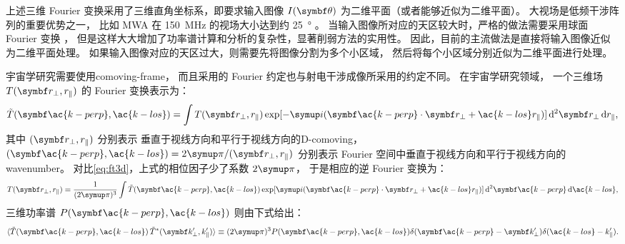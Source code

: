 上述三维 Fourier 变换采用了三维直角坐标系，即要求输入图像 $I(\B{\theta})$
为二维平面（或者能够近似为二维平面）。
大视场是低频干涉阵列的重要优势之一，
比如 MWA 在 \SI{150}{\MHz} 的视场大小达到约 \SI{25}{\degree} \cite{tingay2013}。
当输入图像所对应的天区较大时，严格的做法需要采用球面 Fourier 变换 \cite{liu2016sph}，
但是这样大大增加了功率谱计算和分析的复杂性，显著削弱方法的实用性。
因此，目前的主流做法是直接将输入图像近似为二维平面处理。
如果输入图像对应的天区过大，则需要先将图像分割为多个小区域，
然后将每个小区域分别近似为二维平面进行处理。

宇宙学研究需要使用\ac{comoving-frame}，
而且采用的 Fourier 约定也与射电干涉成像所采用的约定不同。
在宇宙学研究领域，
一个三维场 $T(\B{r}_{\perp}, r_{\parallel})$ 的 Fourier 变换表示为：
\begin{equation}
  \label{eq:ft3d-k}
  \tilde{T}(\B{\ac{k-perp}}, \ac{k-los}) =
    \int T(\B{r}_{\perp}, r_{\parallel})
    \exp[ -\Ci (\B{\ac{k-perp}} \cdot \B{r}_{\perp}
      + \ac{k-los} r_{\parallel}) ]
    \,\mathrm{d}^2\B{r}_{\perp} \,\D{r_{\parallel}} ,
\end{equation}
其中 $(\B{r}_{\perp}, r_{\parallel})$ 分别表示
垂直于视线方向和平行于视线方向的\acl{D-comoving}，
$(\B{\ac{k-perp}}, \ac{k-los}) = 2\Cpi / (\B{r}_{\perp}, r_{\parallel})$
分别表示 Fourier 空间中垂直于视线方向和平行于视线方向的\ac{wavenumber}。
对比\autoref{eq:ft3d}，上式的相位因子少了系数 $2\Cpi$，
于是相应的逆 Fourier 变换为：
\begin{equation}
  T(\B{r}_{\perp}, r_{\parallel}) =
    \frac{1}{(2\Cpi)^3} \int \tilde{T}(\B{\ac{k-perp}}, \ac{k-los})
    \exp[ \Ci (\B{\ac{k-perp}} \cdot \B{r}_{\perp}
      + \ac{k-los} r_{\parallel}) ]
    \,\mathrm{d}^2\B{\ac{k-perp}} \,\D{\ac{k-los}} ,
\end{equation}
三维功率谱 $P(\B{\ac{k-perp}}, \ac{k-los})$ 则由下式给出：
\begin{equation}
  \label{eq:ps3d-k}
  \langle \tilde{T}(\B{\ac{k-perp}}, \ac{k-los})
      \, \tilde{T}^*(\B{k}'_{\perp}, k'_{\parallel}) \rangle
    \equiv (2\Cpi)^3 P(\B{\ac{k-perp}}, \ac{k-los})
      \delta(\B{\ac{k-perp}} - \B{k}'_{\perp})
      \delta(\ac{k-los} - k'_{\parallel}) .
\end{equation}

